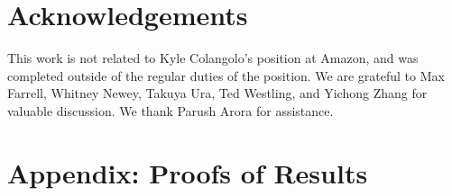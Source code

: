 \documentclass[lettersize, 12pt]{article}
\renewcommand{\thesection}{\arabic{section}}
\renewcommand{\theequation}{\arabic{section}.\arabic{equation}}
\begin{document}

\section*{Acknowledgements}
This work is not related to Kyle Colangolo's position at Amazon, and was completed outside of the regular duties of the position.
We are grateful to Max Farrell, Whitney Newey, Takuya Ura, Ted Westling, and Yichong Zhang for valuable discussion.
We thank Parush Arora for assistance.

{\small
}





\newpage


    \section*{Appendix: Proofs of Results}
    \renewcommand{\theequation}{A.\arabic{equation}}
    \renewcommand{\thesection}{A}
    \setcounter{equation}{0}


%
\end{document}

